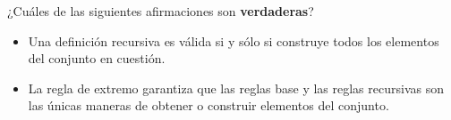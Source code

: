 \documentclass[oneside]{style}
\begin{document}
\begin{questions}[label=\protect\circled{\bfseries\arabic*}]
    \newpage
    \question
    {
        ¿Cuáles de las siguientes afirmaciones son \textbf{verdaderas}?
        \begin{itemize}
            \item Una definición recursiva es válida si y sólo si 
            construye todos los elementos del conjunto en cuestión. 

            \item La regla de extremo garantiza que las reglas base 
            y las reglas recursivas son las únicas maneras de obtener 
            o construir elementos del conjunto. 
        \end{itemize}
    }

\end{questions}
\end{document}
